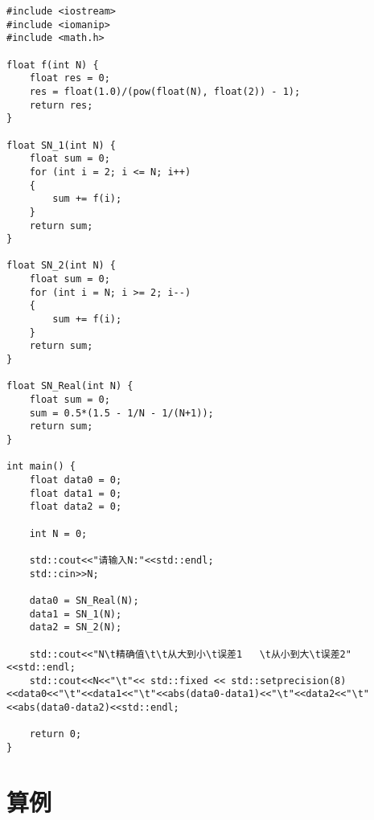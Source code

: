 \begin{lstlisting}[style = cpp]
#include <iostream>
#include <iomanip>
#include <math.h>

float f(int N) {
    float res = 0;
    res = float(1.0)/(pow(float(N), float(2)) - 1);
    return res;
}

float SN_1(int N) {
    float sum = 0;
    for (int i = 2; i <= N; i++)
    {
        sum += f(i);
    }
    return sum;
}

float SN_2(int N) {
    float sum = 0;
    for (int i = N; i >= 2; i--)
    {
        sum += f(i);
    }
    return sum;
}

float SN_Real(int N) {
    float sum = 0;
    sum = 0.5*(1.5 - 1/N - 1/(N+1));
    return sum;
}

int main() {
    float data0 = 0;
    float data1 = 0;
    float data2 = 0;

    int N = 0;

    std::cout<<"请输入N:"<<std::endl;
    std::cin>>N;

    data0 = SN_Real(N);
    data1 = SN_1(N);
    data2 = SN_2(N);

    std::cout<<"N\t精确值\t\t从大到小\t误差1   \t从小到大\t误差2"<<std::endl;
    std::cout<<N<<"\t"<< std::fixed << std::setprecision(8)<<data0<<"\t"<<data1<<"\t"<<abs(data0-data1)<<"\t"<<data2<<"\t"<<abs(data0-data2)<<std::endl;

    return 0;
}
\end{lstlisting}

\section{算例}

